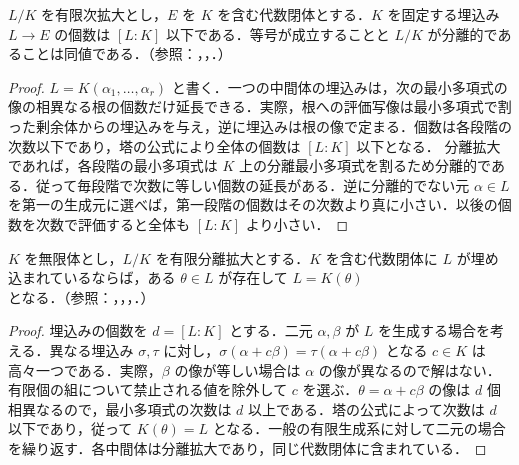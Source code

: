 \begin{prop}[有限次拡大の埋込み数]
$L/K$ を有限次拡大とし，$E$ を $K$ を含む代数閉体とする．$K$ を固定する埋込み $L\to E$ の個数は $[L:K]$ 以下である．等号が成立することと $L/K$ が分離的であることは同値である．（参照：，，．）
\end{prop}
\begin{proof}
$L=K(\alpha_1,\ldots,\alpha_r)$ と書く．一つの中間体の埋込みは，次の最小多項式の像の相異なる根の個数だけ延長できる．実際，根への評価写像は最小多項式で割った剰余体からの埋込みを与え，逆に埋込みは根の像で定まる．個数は各段階の次数以下であり，塔の公式により全体の個数は $[L:K]$ 以下となる．
分離拡大であれば，各段階の最小多項式は $K$ 上の分離最小多項式を割るため分離的である．従って毎段階で次数に等しい個数の延長がある．逆に分離的でない元 $\alpha\in L$ を第一の生成元に選べば，第一段階の個数はその次数より真に小さい．以後の個数を次数で評価すると全体も $[L:K]$ より小さい．
\end{proof}
\begin{prop}[無限体上の原始元の存在]
$K$ を無限体とし，$L/K$ を有限分離拡大とする．$K$ を含む代数閉体に $L$ が埋め込まれているならば，ある $\theta\in L$ が存在して $L=K(\theta)$ となる．（参照：，，，．）
\end{prop}
\begin{proof}
埋込みの個数を $d=[L:K]$ とする．二元 $\alpha,\beta$ が $L$ を生成する場合を考える．異なる埋込み $\sigma,\tau$ に対し，$\sigma(\alpha+c\beta)=\tau(\alpha+c\beta)$ となる $c\in K$ は高々一つである．実際，$\beta$ の像が等しい場合は $\alpha$ の像が異なるので解はない．有限個の組について禁止される値を除外して $c$ を選ぶ．$\theta=\alpha+c\beta$ の像は $d$ 個相異なるので，最小多項式の次数は $d$ 以上である．塔の公式によって次数は $d$ 以下であり，従って $K(\theta)=L$ となる．一般の有限生成系に対して二元の場合を繰り返す．各中間体は分離拡大であり，同じ代数閉体に含まれている．
\end{proof}

